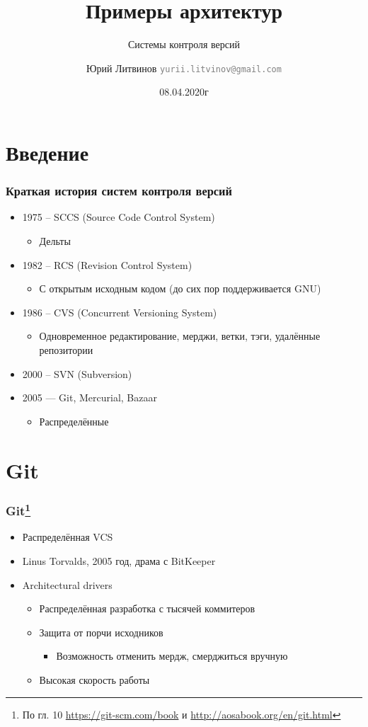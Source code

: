 \documentclass[xetex,mathserif,serif]{beamer}
\title{Примеры архитектур}
\subtitle{Системы контроля версий}
\author[Юрий Литвинов]{Юрий Литвинов \newline \textcolor{gray}{\small\texttt{yurii.litvinov@gmail.com}}}
\date{08.04.2020г}
\begin{document}
	
	\frame{\titlepage}

	\section{Введение}

	\begin{frame}
		\frametitle{Краткая история систем контроля версий}
		\begin{itemize}
			\item 1975 -- SCCS (Source Code Control System)
			\begin{itemize}
				\item Дельты
			\end{itemize}
			\item 1982 -- RCS (Revision Control System)
			\begin{itemize}
				\item С открытым исходным кодом (до сих пор поддерживается GNU)
			\end{itemize}
			\item 1986 -- CVS (Concurrent Versioning System)
			\begin{itemize}
				\item Одновременное редактирование, мерджи, ветки, тэги, удалённые репозитории
			\end{itemize}
			\item 2000 -- SVN (Subversion)
			\item 2005 --- Git, Mercurial, Bazaar
			\begin{itemize}
				\item Распределённые
			\end{itemize}
		\end{itemize}
	\end{frame}

	\section{Git}

	\begin{frame}
		\frametitle{Git\footnote{\tiny{По гл. 10 \url{https://git-scm.com/book} и \url{http://aosabook.org/en/git.html}}}}
		\begin{itemize}
			\item Распределённая VCS
			\item Linus Torvalds, 2005 год, драма с BitKeeper
			\item Architectural drivers
			\begin{itemize}
				\item Распределённая разработка с тысячей коммитеров
				\item Защита от порчи исходников
				\begin{itemize}
					\item Возможность отменить мердж, смерджиться вручную
				\end{itemize}
				\item Высокая скорость работы
			\end{itemize}
		\end{itemize}
	\end{frame}
\end{document}

